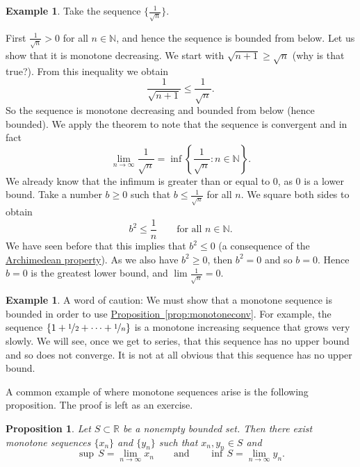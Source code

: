 \documentclass[12pt]{book}
\newcommand{\R}{{\mathbb{R}}}
\newcommand{\N}{{\mathbb{N}}}
\theoremstyle{plain}
\newtheorem{prop}[thm]{Proposition}
\theoremstyle{remark}
\theoremstyle{definition}
\theoremstyle{exercise}
\theoremstyle{example}
\newtheorem{example}[thm]{Example}
\newcommand{\propref}[1]{\hyperref[#1]{Proposition~\ref*{#1}}}
\begin{document}
\begin{example}
Take the sequence $\{ \frac{1}{\sqrt{n}} \}$.

First $\frac{1}{\sqrt{n}} > 0$ for all $n \in \N$, and hence the sequence is
bounded from below.
Let us show that it is monotone decreasing.  We start with
$\sqrt{n+1} \geq \sqrt{n}$ (why is that true?).  From this inequality
we obtain
\begin{equation*}
\frac{1}{\sqrt{n+1}} \leq \frac{1}{\sqrt{n}} .
\end{equation*}
So the sequence is monotone decreasing and bounded from below (hence
bounded).  We apply the theorem to note that the sequence is
convergent and in fact
\begin{equation*}
\lim_{n\to \infty} \frac{1}{\sqrt{n}}
=
\inf \left\{ \frac{1}{\sqrt{n}} : n \in \N \right\} .
\end{equation*}
We already know that the infimum is greater than or equal to 0, as
0 is a lower bound.  Take a number $b \geq 0$ such
that $b \leq \frac{1}{\sqrt{n}}$ for all $n$.  We square both sides to
obtain
\begin{equation*}
b^2 \leq \frac{1}{n} \qquad \text{for all $n \in \N$}.
\end{equation*}
We have seen before that this implies that $b^2 \leq 0$ (a consequence
of the \hyperref[thm:arch:i]{Archimedean property}).  As we also have $b^2 \geq 0$, then $b^2 = 0$
and so $b = 0$.
Hence $b=0$ is the greatest lower bound, and $\lim \frac{1}{\sqrt{n}} = 0$.
\end{example}

\begin{example}
A word of caution:  We must show that a monotone sequence is bounded
in order to use \propref{prop:monotoneconv}.  For
example, 
the sequence $\{ 1 + \nicefrac{1}{2} + \cdots + \nicefrac{1}{n} \}$
is a monotone increasing
sequence that grows very slowly.  We will see, once we get to series,
that this sequence has no upper bound and so does not converge.  It is not
at all obvious that this sequence has no upper bound.
\end{example}

A common example of where monotone sequences arise is the following
proposition.  The proof is left as an exercise.

\begin{prop} \label{prop:supinfseq}
Let $S \subset \R$ be a nonempty bounded set.
Then there exist monotone sequences
$\{ x_n \}$ and $\{ y_n \}$ such that $x_n, y_n \in S$ and
\begin{equation*}
\sup\,S = \lim_{n\to \infty} x_n \qquad \text{and} \qquad \inf\,S =
\lim_{n\to\infty} y_n .
\end{equation*}
\end{prop}
\end{document}
